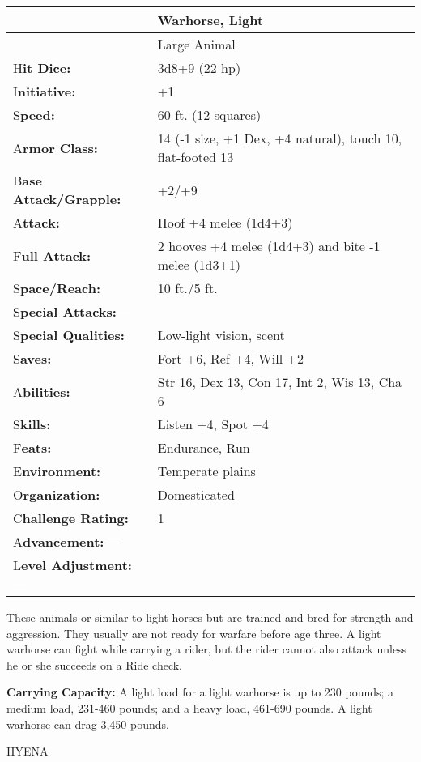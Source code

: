 \documentclass{article}
\begin{document}
\vspace{12pt}
\begin{tabular}{|>{\raggedright}p{91pt}|>{\raggedright}p{226pt}|}
\hline
 & Warhorse, Light\tabularnewline
\hline
 & Large Animal\tabularnewline
\hline
H\textbf{it Dice:} & 3d8+9 (22 hp)\tabularnewline
\hline
I\textbf{nitiative:} & +1\tabularnewline
\hline
S\textbf{peed:} & 60 ft. (12 squares)\tabularnewline
\hline
A\textbf{rmor Class:} & 14 (-1 size, +1 Dex, +4 natural), touch 10, flat-footed 
13\tabularnewline
\hline
B\textbf{ase Attack/Grapple:} & +2/+9\tabularnewline
\hline
A\textbf{ttack:} & Hoof +4 melee (1d4+3)\tabularnewline
\hline
F\textbf{ull Attack:} & 2 hooves +4 melee (1d4+3) and bite -1 melee (1d3+1)\tabularnewline
\hline
S\textbf{pace/Reach:} & 10 ft./5 ft.\tabularnewline
\hline
S\textbf{pecial Attacks:}--- & \tabularnewline
\hline
S\textbf{pecial Qualities:} & Low-light vision, scent\tabularnewline
\hline
S\textbf{aves:} & Fort +6, Ref +4, Will +2\tabularnewline
\hline
A\textbf{bilities:} & Str 16, Dex 13, Con 17, Int 2, Wis 13, Cha 6\tabularnewline
\hline
S\textbf{kills:} & Listen +4, Spot +4\tabularnewline
\hline
F\textbf{eats:} & Endurance, Run\tabularnewline
\hline
E\textbf{nvironment:} & Temperate plains\tabularnewline
\hline
O\textbf{rganization:} & Domesticated\tabularnewline
\hline
C\textbf{hallenge Rating:} & 1\tabularnewline
\hline
A\textbf{dvancement:}--- & \tabularnewline
\hline
L\textbf{evel Adjustment:}--- & \tabularnewline
\hline
\end{tabular}

These animals or similar to light horses but are trained and bred for strength 
and aggression. They usually are not ready for warfare before age three. A light 
warhorse can fight while carrying a rider, but the rider cannot also attack unless 
he or she succeeds on a Ride check.

\textbf{Carrying Capacity:} A light load for a light warhorse is up to 230 pounds; 
a medium load, 231-460 pounds; and a heavy load, 461-690 pounds. A light warhorse 
can drag 3,450 pounds.

\vspace{12pt}
HYENA
\end{document}
